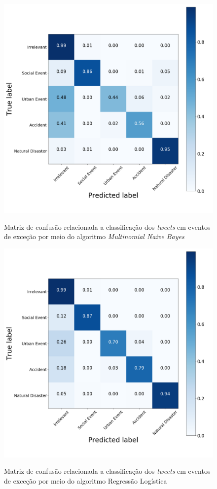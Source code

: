 \documentclass[
	12pt,				%
	oneside,			%
	a4paper,			%
	english,			%
	brazil				%
	]{abntex2ppgsi}
\begin{document}
{{\begin{apendicesenv}
\begin{figure}[!htb]
	\centering
 	  \caption{Matriz de confusão relacionada a classificação dos \textit{tweets} em eventos de exceção por meio do algoritmo \textit{Multinomial Naive Bayes}}
		\includegraphics[width=1\linewidth]{images/confusion_matrix_mnb.png}
	\label{fig:confusion_matrix_mnb}
\end{figure}

\begin{figure}[!htb]
	\centering
 	  \caption{Matriz de confusão relacionada a classificação dos \textit{tweets} em eventos de exceção por meio do algoritmo Regressão Logística}
		\includegraphics[width=1\linewidth]{images/confusion_matrix_lr.png}
	\label{fig:confusion_matrix_rl}
\end{figure}


\end{apendicesenv}}}
\end{document}
